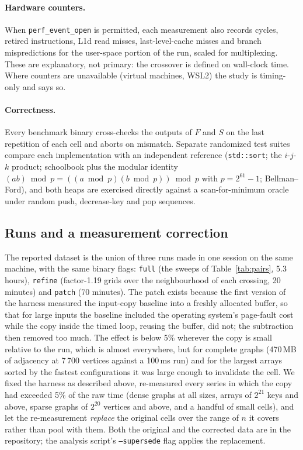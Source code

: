 \paragraph{Hardware counters.} When \texttt{perf\_event\_open} is permitted,
each measurement also records cycles, retired instructions, L1d read misses,
last-level-cache misses and branch mispredictions for the user-space portion of
the run, scaled for multiplexing. These are explanatory, not primary: the
crossover is defined on wall-clock time. Where counters are unavailable (virtual
machines, WSL2) the study is timing-only and says so.

\paragraph{Correctness.} Every benchmark binary cross-checks the outputs of $F$
and $S$ on the last repetition of each cell and aborts on mismatch. Separate
randomized test suites compare each implementation with an independent
reference (\texttt{std::sort}; the $i$-$j$-$k$ product; schoolbook plus the
modular identity $(ab)\bmod p = ((a\bmod p)(b\bmod p))\bmod p$ with
$p=2^{61}-1$; Bellman--Ford), and both heaps are exercised directly against a
scan-for-minimum oracle under random push, decrease-key and pop sequences.

\subsection{Runs and a measurement correction}\label{sec:method-patch}
The reported dataset is the union of three runs made in one session on the
same machine, with the same binary flags: \texttt{full} (the sweeps of
Table~\ref{tab:pairs}, 5.3 hours), \texttt{refine} (factor-1.19 grids over
the neighbourhood of each crossing, 20 minutes) and \texttt{patch} (70
minutes). The patch exists because the first version of the harness measured
the input-copy baseline into a freshly allocated buffer, so that for large
inputs the baseline included the operating system's page-fault cost while the
copy inside the timed loop, reusing the buffer, did not; the subtraction then
removed too much. The effect is below 5\% wherever the copy is small relative
to the run, which is almost everywhere, but for complete graphs (470\,MB of
adjacency at 7\,700 vertices against a 100\,ms run) and for the largest
arrays sorted by the fastest configurations it was large enough to invalidate
the cell. We fixed the harness as described above, re-measured every series in
which the copy had exceeded 5\% of the raw time (dense graphs at all sizes,
arrays of $2^{21}$ keys and above, sparse graphs of $2^{20}$ vertices and
above, and a handful of small cells), and let the re-measurement
\emph{replace} the original cells over the range of $n$ it covers rather than
pool with them. Both the original and the corrected data are in the
repository; the analysis script's \texttt{--supersede} flag applies the
replacement.

